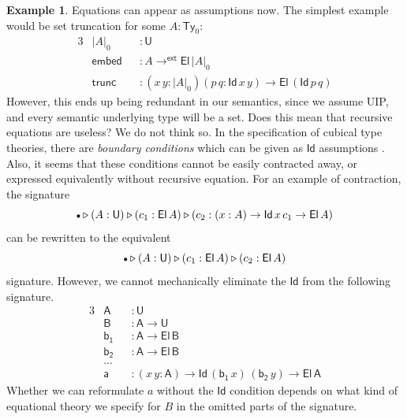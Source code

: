 \documentclass[12pt,a4paper,twoside,openany]{book}
\theoremstyle{remark}
\theoremstyle{definition}
\newtheorem{myexample}{Example}
\theoremstyle{theorem}
\newcommand{\ms}[1]{\mathsf{#1}}
\newcommand{\Ty}{\mathsf{Ty}}
\newcommand{\U}{\mathsf{U}}
\newcommand{\El}{\mathsf{El}}
\newcommand{\Id}{\mathsf{Id}}
\newcommand{\ext}{\triangleright}
\newcommand{\emptycon}{\scaleobj{.75}\bullet}
\newcommand{\toe}{\to^{\ms{ext}}}
\begin{document}
\begin{myexample} Equations can appear as assumptions now. The simplest
example would be set truncation for some $A : \Ty_0$:
\begin{alignat*}{3}
  &|A|_0      &&: \U\\
  &\ms{embed} &&: A \toe \El\,|A|_0 \\
  &\ms{trunc} &&: (x\,y : |A|_0)(p\,q : \Id\,x\,y) \to \El\,(\Id\,p\,q)
\end{alignat*}
However, this ends up being redundant in our semantics, since we assume UIP,
and every semantic underlying type will be a set. Does this mean that recursive
equations are useless? We do not think so. In the specification of cubical type
theories, there are \emph{boundary conditions} which can be given as $\Id$
assumptions \cite{cchm,angiuli2016computational,angiuli2018cartesian}. Also, it
seems that these conditions cannot be easily contracted away, or expressed
equivalently without recursive equation. For an example of contraction, the
signature
\[\emptycon \ext (A : \U) \ext (c_1 : \El\,A) \ext (c_2 : (x : A) \to \Id\,x\,c_1 \to \El\,A)\]
can be rewritten to the equivalent
\[\emptycon \ext (A : \U) \ext (c_1 : \El\,A) \ext (c_2 : \El\,A)\]
signature. However, we cannot mechanically eliminate the $\Id$ from the following signature.
\begin{alignat*}{3}
  &\ms{A  } &&: \U\\
  &\ms{B  } &&: \ms{A} \to \U\\
  &\ms{b_1} &&: \ms{A} \to \El\,\ms{B}\\
  &\ms{b_2} &&: \ms{A} \to \El\,\ms{B}\\
  &...&&\\
  &\ms{a}   &&: (x\,y : \ms{A}) \to \Id\,(\ms{b_1}\,x)\,(\ms{b_2}\,y) \to \El\,\ms{A}
\end{alignat*}
Whether we can reformulate $a$ without the $\Id$ condition depends on what kind
of equational theory we specify for $B$ in the omitted parts of the signature.
\end{myexample}
\end{document}

